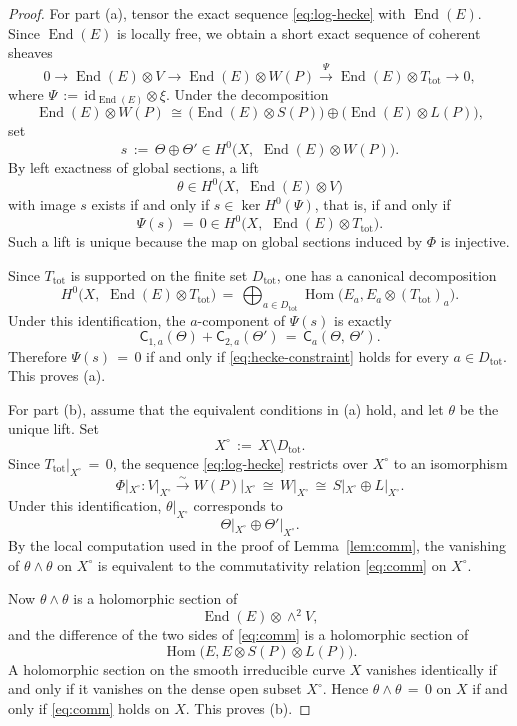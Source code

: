 \documentclass[10pt,a4paper]{amsart}
\newcommand{\End}{\operatorname{End}}
\newcommand{\Hom}{\operatorname{Hom}}
\newcommand{\id}{\mathrm{id}}
\begin{document}
\begin{proof}
For part \textup{(a)}, tensor the exact sequence \eqref{eq:log-hecke} with \(\End(E)\).  Since \(\End(E)\) is locally free, we obtain a short exact sequence of coherent sheaves
\[
0\longrightarrow \End(E)\otimes V
\longrightarrow
\End(E)\otimes W(P)
\xrightarrow{\ \Psi\ }
\End(E)\otimes T_{\mathrm{tot}}
\longrightarrow 0,
\]
where \(\Psi\,:=\,\id_{\End(E)}\otimes \xi\).  Under the decomposition
\[
\End(E)\otimes W(P)
\,\cong\,
\bigl(\End(E)\otimes S(P)\bigr)\oplus \bigl(\End(E)\otimes L(P)\bigr),
\]
set
\[
s\,:=\,\Theta\oplus \Theta'
\in H^0\bigl(X,\,\, \End(E)\otimes W(P)\bigr).
\]
By left exactness of global sections, a lift
\[
\theta\in H^0\bigl(X,\,\, \End(E)\otimes V\bigr)
\]
with image \(s\) exists if and only if \(s\in \ker H^0(\Psi)\), that is, if and only if
\[
\Psi(s)\,=\,0\in H^0\bigl(X,\,\, \End(E)\otimes T_{\mathrm{tot}}\bigr).
\]
Such a lift is unique because the map on global sections induced by \(\Phi\) is injective.

Since \(T_{\mathrm{tot}}\) is supported on the finite set \(D_{\mathrm{tot}}\), one has a canonical decomposition
\[
H^0\bigl(X,\,\, \End(E)\otimes T_{\mathrm{tot}}\bigr)
\,=\,
\bigoplus_{a\in D_{\mathrm{tot}}}
\Hom\bigl(E_a,E_a\otimes (T_{\mathrm{tot}})_a\bigr).
\]
Under this identification, the \(a\)-component of \(\Psi(s)\) is exactly
\[
\mathsf{C}_{1,a}(\Theta)+\mathsf{C}_{2,a}(\Theta')\,=\,\mathsf{C}_a(\Theta,\,\Theta').
\]
Therefore \(\Psi(s)\,=\,0\) if and only if \eqref{eq:hecke-constraint} holds for every \(a\in D_{\mathrm{tot}}\).  This proves \textup{(a)}.

For part \textup{(b)}, assume that the equivalent conditions in \textup{(a)} hold, and let \(\theta\) be the unique lift.  Set
\[
X^\circ\,:=\,X\setminus D_{\mathrm{tot}}.
\]
Since \(T_{\mathrm{tot}}|_{X^\circ}\,=\,0\), the sequence \eqref{eq:log-hecke} restricts over \(X^\circ\) to an isomorphism
\[
\Phi|_{X^\circ}:V|_{X^\circ}\xrightarrow{\sim} W(P)|_{X^\circ}\,\cong\, W|_{X^\circ}
\,\cong\, S|_{X^\circ}\oplus L|_{X^\circ}.
\]
Under this identification, \(\theta|_{X^\circ}\) corresponds to
\[
\Theta|_{X^\circ}\oplus \Theta'|_{X^\circ}.
\]
By the local computation used in the proof of Lemma~\ref{lem:comm}, the vanishing of \(\theta\wedge\theta\) on \(X^\circ\) is equivalent to the commutativity relation \eqref{eq:comm} on \(X^\circ\).

Now \(\theta\wedge\theta\) is a holomorphic section of
\[
\End(E)\otimes \wedge^2V,
\]
and the difference of the two sides of \eqref{eq:comm} is a holomorphic section of
\[
\Hom\bigl(E,E\otimes S(P)\otimes L(P)\bigr).
\]
A holomorphic section on the smooth irreducible curve \(X\) vanishes identically if and only if it vanishes on the dense open subset \(X^\circ\).  Hence \(\theta\wedge\theta\,=\,0\) on \(X\) if and only if \eqref{eq:comm} holds on \(X\).  This proves \textup{(b)}.
\end{proof}
\end{document}
